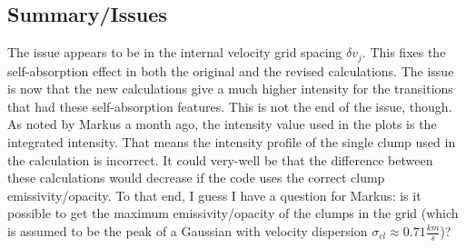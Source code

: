 \documentclass[a4paper]{article}
\begin{document}
    \subsection{Summary/Issues}

    The issue appears to be in the internal velocity grid spacing \(\delta v_j\).
    This fixes the self-absorption effect in both the original and the revised calculations.
    The issue is now that the new calculations give a much higher intensity for the transitions that had these self-absorption features.
    This is not the end of the issue, though.
    As noted by Markus a month ago, the intensity value used in the plots is the integrated intensity.
    That means the intensity profile of the single clump used in the calculation is incorrect.
    It could very-well be that the difference between these calculations would decrease if the code uses the correct clump emissivity/opacity.
    To that end, I guess I have a question for Markus: is it possible to get the maximum emissivity/opacity of the clumps in the grid (which is assumed to be the peak of a Gaussian with velocity dispersion \(\sigma_{cl} \approx 0.71 \frac{km}{s}\))?
\end{document}
